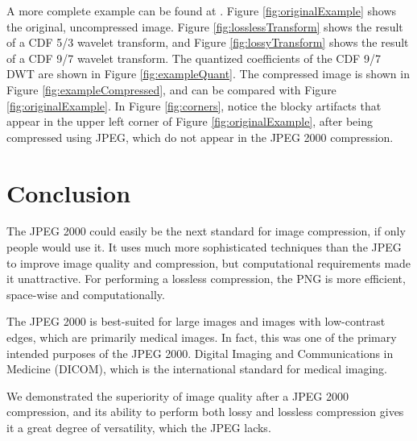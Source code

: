 \documentclass[titlepage,12pt]{article}
\begin{document}
A more complete example can be found at \cite{whydomath}.
Figure \ref{fig:originalExample} shows the original, uncompressed image.
Figure \ref{fig:losslessTransform} shows the result of a CDF 5/3 wavelet transform,
and Figure \ref{fig:lossyTransform} shows the result of a CDF 9/7 wavelet transform.
The quantized coefficients of the CDF 9/7 DWT are shown in Figure \ref{fig:exampleQuant}.
The compressed image is shown in Figure \ref{fig:exampleCompressed}, 
and can be compared with Figure \ref{fig:originalExample}.
In Figure \ref{fig:corners}, notice the blocky artifacts that appear in the upper left corner
of Figure \ref{fig:originalExample}, after being compressed using JPEG,
which do not appear in the JPEG 2000 compression.


\section{Conclusion}

The JPEG 2000 could easily be the next standard for image compression, if only people would use it.
It uses much more sophisticated techniques than the JPEG to improve image quality and compression,
but computational requirements made it unattractive.
For performing a lossless compression, the PNG is more efficient, space-wise and computationally.

The JPEG 2000 is best-suited for large images and images with low-contrast edges,
which are primarily medical images.
In fact, this was one of the primary intended purposes of the JPEG 2000.
Digital Imaging and Communications in Medicine (DICOM), 
which is the international standard for medical imaging.\cite{dicom}

We demonstrated the superiority of image quality after a JPEG 2000 compression, 
and its ability to perform both lossy and lossless compression gives it a 
great degree of versatility, which the JPEG lacks.


\printbibliography


%
\end{document}
